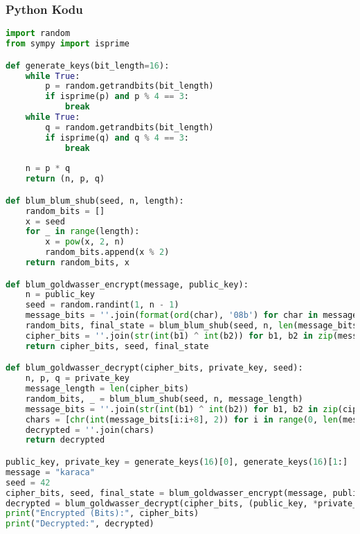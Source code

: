 \subsubsection{Python Kodu}

\begin{lstlisting}[language=Python]
import random
from sympy import isprime

def generate_keys(bit_length=16):
    while True:
        p = random.getrandbits(bit_length)
        if isprime(p) and p % 4 == 3:
            break
    while True:
        q = random.getrandbits(bit_length)
        if isprime(q) and q % 4 == 3:
            break
    
    n = p * q
    return (n, p, q)

def blum_blum_shub(seed, n, length):
    random_bits = []
    x = seed
    for _ in range(length):
        x = pow(x, 2, n)
        random_bits.append(x % 2)
    return random_bits, x

def blum_goldwasser_encrypt(message, public_key):
    n = public_key
    seed = random.randint(1, n - 1)
    message_bits = ''.join(format(ord(char), '08b') for char in message)
    random_bits, final_state = blum_blum_shub(seed, n, len(message_bits))
    cipher_bits = ''.join(str(int(b1) ^ int(b2)) for b1, b2 in zip(message_bits, random_bits))
    return cipher_bits, seed, final_state

def blum_goldwasser_decrypt(cipher_bits, private_key, seed):
    n, p, q = private_key
    message_length = len(cipher_bits)
    random_bits, _ = blum_blum_shub(seed, n, message_length)
    message_bits = ''.join(str(int(b1) ^ int(b2)) for b1, b2 in zip(cipher_bits, random_bits))
    chars = [chr(int(message_bits[i:i+8], 2)) for i in range(0, len(message_bits), 8)]
    decrypted = ''.join(chars)
    return decrypted

public_key, private_key = generate_keys(16)[0], generate_keys(16)[1:]
message = "karaca"
seed = 42
cipher_bits, seed, final_state = blum_goldwasser_encrypt(message, public_key)
decrypted = blum_goldwasser_decrypt(cipher_bits, (public_key, *private_key), seed)
print("Encrypted (Bits):", cipher_bits)
print("Decrypted:", decrypted)
\end{lstlisting}

\newpage